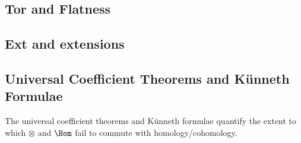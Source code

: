 

\subsection{Tor and Flatness}







\subsection{Ext and extensions}







\begin{lemma}
\end{lemma}




\subsection{Universal Coefficient Theorems and K\"unneth Formulae}

The universal coefficient theorems and K\"unneth formulae quantify the extent to which $\otimes$ and $\Hom$ fail to commute with homology/cohomology.











